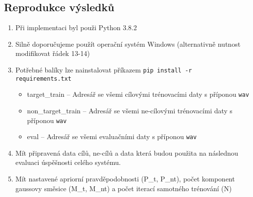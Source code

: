 \documentclass[a4paper,11pt]{article}
\begin{document}
		\subsection{Reprodukce výsledků}
			\begin{enumerate}
				\item Při implementaci byl použi Python 3.8.2
				\item Silně doporučujeme použít operační systém Windows (alternativně nutnost modifikovat řádek 13-14)
				\item Potřebné balíky lze nainstalovat příkazem \texttt{pip install -r requirements.txt}
				
				\begin{itemize}
					\item target\_train -- Adresář se všemi cílovými trénovacími daty s příponou \texttt{wav}
					\item non\_target\_train -- Adresář se všemi ne-cílovými trénovacími daty s příponou \texttt{wav}
					\item eval -- Adresář se všemi evaluačními daty s příponou \texttt{wav}
				\end{itemize}
			
				\item Mít připravená data cílů, ne-cílů a data která budou použita na následnou evaluaci úspěšnosti celého systému.
				\item Mít nastavené apriorní pravděpodobnosti (P\_t, P\_nt), počet komponent gaussovy směsice (M\_t, M\_nt) a počet iterací samotného trénování (N)
			\end{enumerate}
\end{document}
